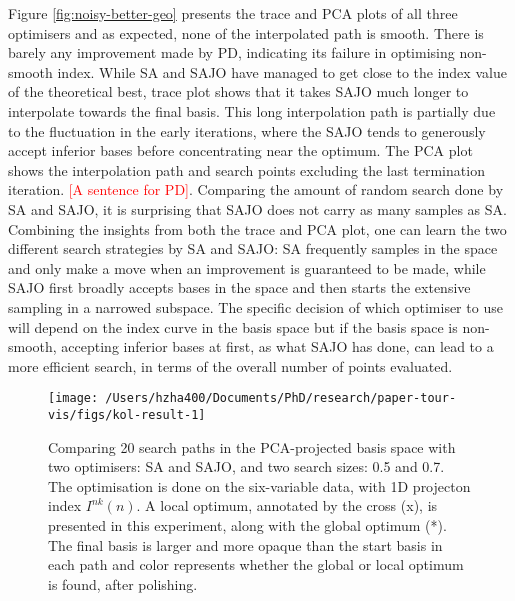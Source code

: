 Figure \ref{fig:noisy-better-geo} presents the trace and PCA plots of
all three optimisers and as expected, none of the interpolated path is
smooth. There is barely any improvement made by PD, indicating its
failure in optimising non-smooth index. While SA and SAJO have managed
to get close to the index value of the theoretical best, trace plot
shows that it takes SAJO much longer to interpolate towards the final
basis. This long interpolation path is partially due to the fluctuation
in the early iterations, where the SAJO tends to generously accept
inferior bases before concentrating near the optimum. The PCA plot shows
the interpolation path and search points excluding the last termination
iteration. \textcolor{red}{[A sentence for PD]}. Comparing the amount of
random search done by SA and SAJO, it is surprising that SAJO does not
carry as many samples as SA. Combining the insights from both the trace
and PCA plot, one can learn the two different search strategies by SA
and SAJO: SA frequently samples in the space and only make a move when
an improvement is guaranteed to be made, while SAJO first broadly
accepts bases in the space and then starts the extensive sampling in a
narrowed subspace. The specific decision of which optimiser to use will
depend on the index curve in the basis space but if the basis space is
non-smooth, accepting inferior bases at first, as what SAJO has done,
can lead to a more efficient search, in terms of the overall number of
points evaluated.

\begin{Schunk}
\begin{figure}

{\centering \texttt{[image: /Users/hzha400/Documents/PhD/research/paper-tour-vis/figs/kol-result-1]} 

}

\caption[Comparing 20 search paths in the PCA-projected basis space with two optimisers]{Comparing 20 search paths in the PCA-projected basis space with two optimisers: SA and SAJO, and two search sizes: 0.5 and 0.7. The optimisation is done on the six-variable data,  with 1D projecton index $I^{nk}(n)$. A local optimum, annotated by the cross (x), is presented in this experiment, along with the global optimum (*). The final basis is larger and more opaque than the start basis in each path and color represents whether the global or local optimum is found, after polishing.}\label{fig:kol-result}
\end{figure}
\end{Schunk}

